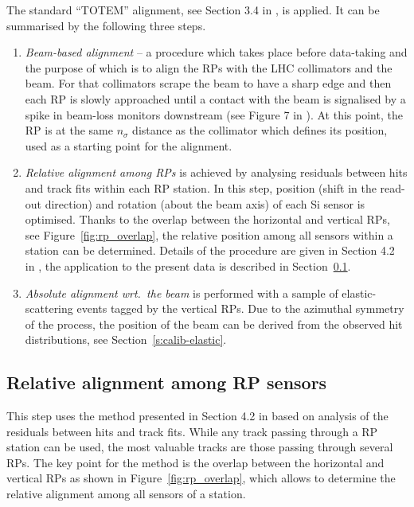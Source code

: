 \documentclass[TOTEM]{cern/cernphprep}
\begin{document}
The standard ``TOTEM'' alignment, see Section 3.4 in \cite{totem-ijmp}, is applied. It can be summarised by the following three steps.
\begin{enumerate}[noitemsep]
\item {\em Beam-based alignment} -- a procedure which takes place before data-taking and the purpose of which is to align the RPs with the LHC collimators and the beam. For that collimators scrape the beam to have a sharp edge and then each RP is slowly approached until a contact with the beam is signalised by a spike in beam-loss monitors downstream (see Figure 7 in \cite{totem-ijmp}). At this point, the RP is at the same $n_\sigma$ distance as the collimator which defines its position, used as a starting point for the alignment.
\item {\em Relative alignment among RPs} is achieved by analysing residuals between hits and track fits within each RP station. In this step, position (shift in the read-out direction) and rotation (about the beam axis) of each Si sensor is optimised. Thanks to the overlap between the horizontal and vertical RPs, see Figure~\ref{fig:rp_overlap}, the relative position among all sensors within a station can be determined. Details of the procedure are given in Section 4.2 in \cite{jan_thesis}, the application to the present data is described in Section~\ref{s:calib-track}.
\item {\em Absolute alignment wrt.~the beam} is performed with a sample of elastic-scattering events tagged by the vertical RPs. Due to the azimuthal symmetry of the process, the position of the beam can be derived from the observed hit distributions, see Section~\ref{s:calib-elastic}.
\end{enumerate}

\subsection{Relative alignment among RP sensors}
\label{s:calib-track}

This step uses the method presented in Section 4.2 in \cite{jan_thesis} based on analysis of the residuals between hits and track fits. While any track passing through a RP station can be used, the most valuable tracks are those passing through several RPs. The key point for the method is the overlap between the horizontal and vertical RPs as shown in Figure~\ref{fig:rp_overlap}, which allows to determine the relative alignment among all sensors of a station.
\end{document}
